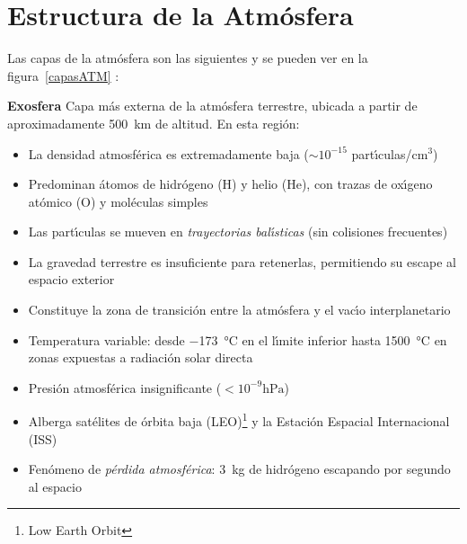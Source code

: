  \section{Estructura de la Atm\'osfera}
 \label{eatmos}
  Las capas de la atm\'osfera son las siguientes y se pueden ver en la figura~\ref{capasATM} :


\textbf{Exosfera}  Capa m\'as externa de la atm\'osfera terrestre, ubicada a partir de aproximadamente \SI{500}{\kilo\metre} de altitud. En esta regi\'on:
\begin{itemize}
    \item La densidad atmosf\'erica es extremadamente baja ($\sim 10^{-15}$ part\'{\i}culas/cm$^3$)
    \item Predominan \'atomos de hidr\'ogeno (H) y helio (He), con trazas de ox\'{\i}geno at\'omico (O) y mol\'eculas simples
    \item Las part\'{\i}culas se mueven en \textit{trayectorias bal\'{\i}sticas} (sin colisiones frecuentes)
    \item La gravedad terrestre es insuficiente para retenerlas, permitiendo su escape al espacio exterior
    \item Constituye la zona de transici\'on entre la atm\'osfera y el vac\'{\i}o interplanetario
    \item Temperatura variable: desde \SI{-173}{\celsius} en el l\'{\i}mite inferior hasta \SI{1500}{\celsius} en zonas expuestas a radiaci\'on solar directa
    \item Presi\'on atmosf\'erica insignificante ($< 10^{-9}\si{\hecto\pascal}$)
    \item Alberga sat\'elites de \'orbita baja (LEO)\footnote{Low Earth Orbit} y la Estaci\'on Espacial Internacional (ISS)
    \item Fen\'omeno de \textit{p\'erdida atmosf\'erica}: \SI{3}{\kilo\gram} de hidr\'ogeno escapando por segundo al espacio
\end{itemize}


